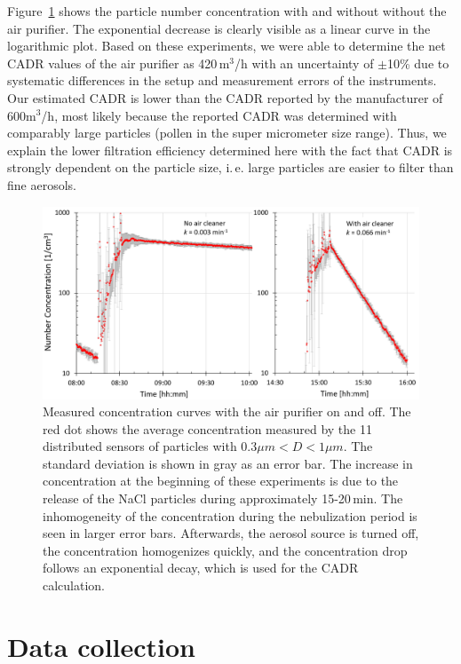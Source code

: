 \documentclass[fleqn,11pt]{wlscirep_supp}
\newcommand\ie{i.\,e.\xspace}
\begin{document}
Figure~\ref{fig:experiment} shows the particle number concentration with and without without the air purifier. The exponential decrease is clearly visible as a linear curve in the logarithmic plot. Based on these experiments, we were able to determine the net CADR values of the air purifier as 420\,m$^3$/h with an uncertainty of $\pm$10\% due to systematic differences in the setup and measurement errors of the instruments. Our estimated CADR is lower than the CADR reported by the manufacturer of 600m$^3$/h, most likely because the reported CADR was determined with comparably large particles (pollen in the super micrometer size range). Thus, we explain the lower filtration efficiency determined here with the fact that CADR is strongly dependent on the particle size, \ie large particles are easier to filter than fine aerosols.

\begin{figure}
    \centering
    \includegraphics[width=\linewidth]{doc/paper/experiment-particle-concentration-decay.png}
    \caption{Measured concentration curves with the air purifier on and off. The red dot shows the average concentration measured by the 11 distributed sensors of particles with $0.3\mu m < D < 1 \mu m$. The standard deviation is shown in gray as an error bar. The increase in concentration at the beginning of these experiments is due to the release of the NaCl particles during approximately 15-20\,min. The inhomogeneity of the concentration during the nebulization period is seen in larger error bars. Afterwards, the aerosol source is turned off, the concentration homogenizes quickly, and the concentration drop follows an exponential decay, which is used for the CADR calculation.}
    \label{fig:experiment}
\end{figure}


\clearpage

\section{Data collection}\label{sec:data-collection}
\end{document}
